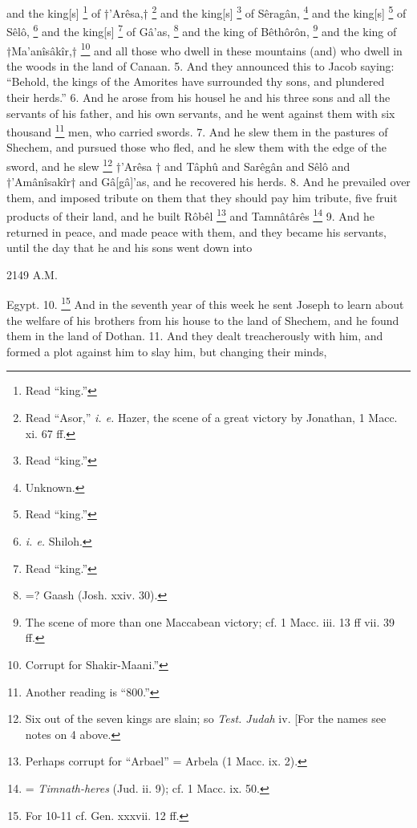and the king[s] \footnote{Read ``king.''} of †’Arêsa,† \footnote{Read ``Asor,'' \emph{i. e.} Hazer, the scene of a great victory by Jonathan, 1 Macc. xi. 67 ff.} and the king[s] \footnote{Read ``king.''} of Sêragân, \footnote{Unknown.} and the king[s] \footnote{Read ``king.''} of Sêlô, \footnote{\emph{i. e.} Shiloh.} and the king[s] \footnote{Read ``king.''} of Gâ’as, \footnote{=? Gaash (Josh. xxiv. 30).} and the king of Bêthôrôn, \footnote{The scene of more than one Maccabean victory; cf. 1 Macc. iii. 13 ff vii. 39 ff.} and the king of †Ma’anîsâkîr,† \footnote{Corrupt for Shakir-Maani.''} and all those who dwell in these mountains (and) who dwell in the woods in the land of Canaan. 5. And they announced this to Jacob saying: ``Behold, the kings of the Amorites have surrounded thy sons, and plundered their herds.'' 6. And he arose from his housel he and his three sons and all the servants of his father, and his own servants, and he went against them with six thousand \footnote{Another reading is ``800.''} men, who carried swords. 7. And he slew them in the pastures of Shechem, and pursued those who fled, and he slew them with the edge of the sword, and he slew \footnote{Six out of the seven kings are slain; so \emph{Test. Judah} iv. [For the names see notes on 4 above.} †’Arêsa † and Tâphû and Sarêgân and Sêlô and †’Amânîsakîr† and Gâ[gâ]’as, and he recovered his herds. 8. And he prevailed over them, and imposed tribute on them that they should pay him tribute, five fruit products of their land, and he built Rôbêl \footnote{Perhaps corrupt for ``Arbael'' = Arbela (1 Macc. ix. 2).} and Tamnâtârês \footnote{= \emph{Timnath-heres} (Jud. ii. 9); cf. 1 Macc. ix. 50.} 9. And he returned in peace, and made peace with them, and they became his servants, until the day that he and his sons went down into

2149 A.M.

Egypt. 10. \footnote{For 10-11 cf. Gen. xxxvii. 12 ff.} And in the seventh year of this week he sent Joseph to learn about the welfare of his brothers from his house to the land of Shechem, and he found them in the land of Dothan. 11. And they dealt treacherously with him, and formed a plot against him to slay him, but changing their minds,

